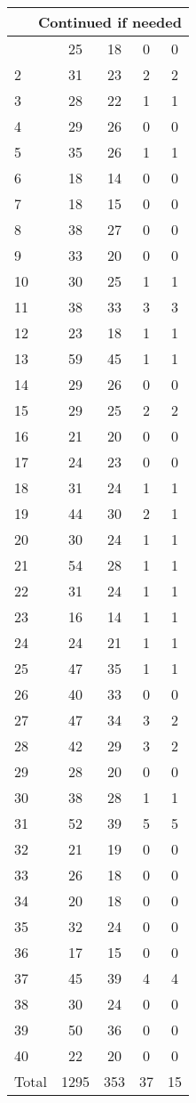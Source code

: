 \begin{center}
\begin{longtable}{l|c|c|c|c}
\hline \multicolumn{5}{|r|}{{Continued if needed}} \\ \hline
\endfoot 
1 & 25 & 18 & 0 & 0\\ \hline
2 & 31 & 23 & 2 & 2\\ \hline
3 & 28 & 22 & 1 & 1\\ \hline
4 & 29 & 26 & 0 & 0\\ \hline
5 & 35 & 26 & 1 & 1\\ \hline
6 & 18 & 14 & 0 & 0\\ \hline
7 & 18 & 15 & 0 & 0\\ \hline
8 & 38 & 27 & 0 & 0\\ \hline
9 & 33 & 20 & 0 & 0\\ \hline
10 & 30 & 25 & 1 & 1\\ \hline
11 & 38 & 33 & 3 & 3\\ \hline
12 & 23 & 18 & 1 & 1\\ \hline
13 & 59 & 45 & 1 & 1\\ \hline
14 & 29 & 26 & 0 & 0\\ \hline
15 & 29 & 25 & 2 & 2\\ \hline
16 & 21 & 20 & 0 & 0\\ \hline
17 & 24 & 23 & 0 & 0\\ \hline
18 & 31 & 24 & 1 & 1\\ \hline
19 & 44 & 30 & 2 & 1\\ \hline
20 & 30 & 24 & 1 & 1\\ \hline
21 & 54 & 28 & 1 & 1\\ \hline
22 & 31 & 24 & 1 & 1\\ \hline
23 & 16 & 14 & 1 & 1\\ \hline
24 & 24 & 21 & 1 & 1\\ \hline
25 & 47 & 35 & 1 & 1\\ \hline
26 & 40 & 33 & 0 & 0\\ \hline
27 & 47 & 34 & 3 & 2\\ \hline
28 & 42 & 29 & 3 & 2\\ \hline
29 & 28 & 20 & 0 & 0\\ \hline
30 & 38 & 28 & 1 & 1\\ \hline
31 & 52 & 39 & 5 & 5\\ \hline
32 & 21 & 19 & 0 & 0\\ \hline
33 & 26 & 18 & 0 & 0\\ \hline
34 & 20 & 18 & 0 & 0\\ \hline
35 & 32 & 24 & 0 & 0\\ \hline
36 & 17 & 15 & 0 & 0\\ \hline
37 & 45 & 39 & 4 & 4\\ \hline
38 & 30 & 24 & 0 & 0\\ \hline
39 & 50 & 36 & 0 & 0\\ \hline
40 & 22 & 20 & 0 & 0\\ \hline
Total & 1295 & 353 & 37 & 15
\end{longtable}
\end{center}



